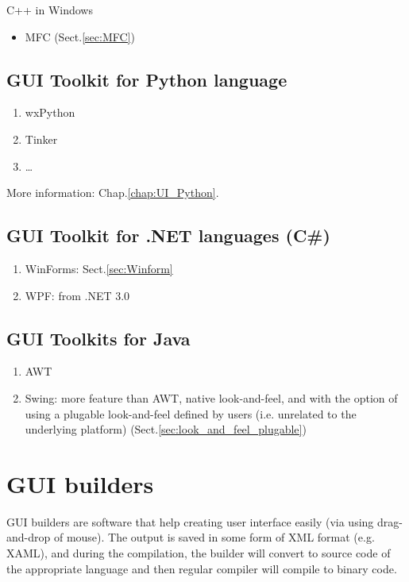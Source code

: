 C++ in Windows
\begin{itemize}
  \item MFC (Sect.\ref{sec:MFC})
\end{itemize}

\subsection{GUI Toolkit for Python language}

\begin{enumerate}
  \item wxPython
  \item Tinker
  \item \ldots
\end{enumerate}
More information: Chap.\ref{chap:UI_Python}.

\subsection{GUI Toolkit for .NET languages (C\#)}

\begin{enumerate}
  \item WinForms: Sect.\ref{sec:Winform}
  \item WPF: from .NET 3.0
\end{enumerate}

\subsection{GUI Toolkits for Java}

\begin{enumerate}
  \item AWT
  \item Swing: more feature than AWT, native look-and-feel, and with the option
  of using a plugable look-and-feel defined by users (i.e. unrelated to
  the underlying platform) (Sect.\ref{sec:look_and_feel_plugable})
  
  
\end{enumerate}

\section{GUI builders}

GUI builders are software that help creating user interface easily (via using
drag-and-drop of mouse). The output is saved in some form of XML format (e.g.
XAML), and during the compilation, the builder will convert to source code of
the appropriate language and then regular compiler will compile to binary code.

